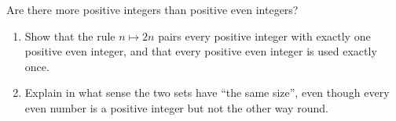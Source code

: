 Are there more positive integers than positive even integers?
\begin{enumerate}
\item[(a)] Show that the rule $n\mapsto2n$ pairs every positive integer with exactly one positive even integer, and that every positive even integer is used exactly once.
\item[(b)] Explain in what sense the two sets have ``the same size'', even though every even number is a positive integer but not the other way round.
\end{enumerate}
